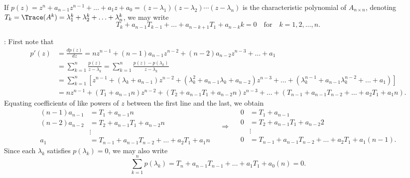 \begin{fact}\label{fact:Tkfork=12n} If $p(z)=z^n + a_{n-1} z^{n-1} + \ldots + a_{1} z + a_{0}=(z-\lambda_1)(z-\lambda_2)\cdots(z-\lambda_n)$ is the characteristic polynomial of $A_{n\times n}$, denoting
$T_k=\Trace(A^k)=\lambda_1^k + \lambda_2^k + \ldots + \lambda_n^k$, we may write
\begin{equation*}
  T_k + a_{n-1} T_{k-1} + \ldots + a_{n-k+1} T_{1} + a_{n-k} k =0 \quad \textrm{for}\quad k=1,2,\ldots,n.
\end{equation*}
\end{fact}

\/: First note that
\begin{align*}
p'(z) &= \frac{d p(z)}{dz} = n z^{n-1} + (n-1) a_{n-1} z^{n-2} + (n-2) a_{n-2} z^{n-3} + \ldots + a_1 \\
      &= \sum_{k=1}^n \frac{p(z)}{z-\lambda_k} = \sum_{k=1}^n \frac{p(z) - p(\lambda_k)}{z-\lambda_k} \\
      &= \sum_{k=1}^n [z^{n-1} + (\lambda_k + a_{n-1}) z^{n-2} + (\lambda_k^2 + a_{n-1} \lambda_k + a_{n-2}) z^{n-3} + \ldots + (\lambda_k^{n-1} + a_{n-1} \lambda_k^{n-2} + \ldots + a_{1})]\\
      & = n z^{n-1} + (T_1 + a_{n-1} n) z^{n-2} + (T_2 + a_{n-1} T_1 + a_{n-2} n) z^{n-3} + \ldots + (T_{n-1} + a_{n-1} T_{n-2} + \ldots + a_{2} T_{1} + a_1 n).
\end{align*}
Equating coefficients of like powers of $z$ between the first line and the last, we obtain
\begin{equation*}
\begin{aligned}
  (n-1) a_{n-1} &= T_1 + a_{n-1} n \\
  (n-2) a_{n-2} &= T_2 + a_{n-1} T_1 + a_{n-2} n \\
  & \vdots \\
  a_1 &= T_{n-1} + a_{n-1} T_{n-2} + \ldots + a_{2} T_{1} + a_1 n
\end{aligned}
\quad \Rightarrow \quad 
\begin{aligned}
  0 &= T_1 + a_{n-1} \\
  0 &= T_2 + a_{n-1} T_1 + a_{n-2} 2 \\
  & \vdots \\
  0 &= T_{n-1} + a_{n-1} T_{n-2} + \ldots + a_{2} T_{1} + a_1 (n-1).
\end{aligned}
\end{equation*}
Since each $\lambda_k$ satisfies $p(\lambda_k)=0$, we may also write
\begin{equation}
  \sum_{k=1}^{n} p(\lambda_k) = T_{n} + a_{n-1} T_{n-1} + \ldots + a_{1} T_{1} + a_0 (n) = 0.  \tag*{$\Box$}
\end{equation}

